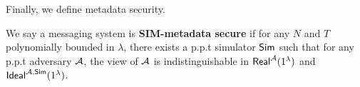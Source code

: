 Finally, we define metadata security.

\begin{definition}
\label{defn:messaging-security}
We say a messaging system is \textbf{SIM-metadata secure} if for any $N$ and $T$ polynomially bounded in $\lambda$, there exists a p.p.t simulator $\mathsf{Sim}$ such that for any p.p.t adversary $\mathcal{A}$, the view of $\mathcal{A}$ is indistinguishable in $\mathsf{Real}^{\mathcal{A}}(1^{\lambda})$ and $\mathsf{Ideal}^{\mathcal{A}, \mathsf{\mathsf{Sim}}}(1^{\lambda})$.
\end{definition}


